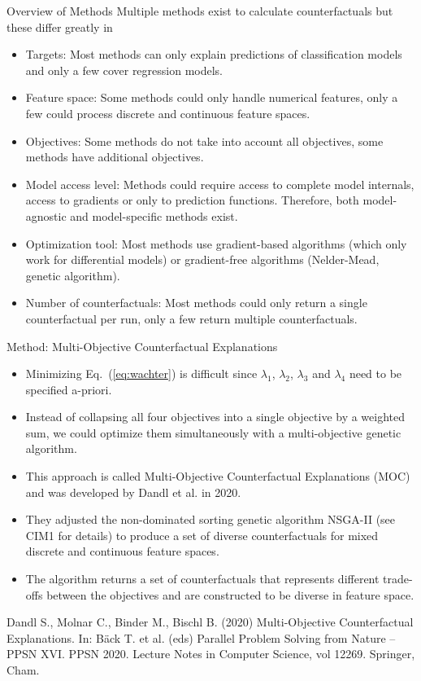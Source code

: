 \documentclass[11pt,compress,t,notes=noshow, xcolor=table]{beamer}
\begin{document}
\begin{vbframe}{Overview of Methods}
	Multiple methods exist to calculate counterfactuals but these differ greatly in 
	\begin{itemize}
		\item Targets: Most methods can only explain predictions of classification models and only a few cover regression models. 
		\item Feature space: Some methods could only handle numerical features, only a few could process discrete and continuous feature spaces. 
		\item Objectives: Some methods do not take into account all objectives, some methods have additional objectives. 
		\item Model access level: Methods could require access to complete model internals, access to gradients or only to prediction functions. Therefore, both model-agnostic and model-specific methods exist. 
		\item Optimization tool: Most methods use gradient-based algorithms (which only work for differential models) or gradient-free algorithms (Nelder-Mead, genetic algorithm). 
		\item Number of counterfactuals: Most methods could only return a single counterfactual per run, only a few return multiple counterfactuals.
	\end{itemize}
\end{vbframe}

\begin{vbframe}{Method: Multi-Objective Counterfactual Explanations}
	\begin{itemize}
		\item Minimizing Eq.~(\ref{eq:wachter}) is difficult since $\lambda_1$, $\lambda_2$, $\lambda_3$ and $\lambda_4$ need to be specified a-priori. 
		\item Instead of collapsing all four objectives into a single objective by a weighted sum, we could optimize them simultaneously with a multi-objective genetic algorithm. 
		\item This approach is called Multi-Objective Counterfactual Explanations (MOC) and was developed by Dandl et al. in 2020. 
		\item They adjusted the non-dominated sorting genetic algorithm NSGA-II (see CIM1 for details) to produce a set of diverse counterfactuals for mixed discrete and continuous feature spaces.
		\item The algorithm returns a set of counterfactuals that represents different trade-offs between the objectives and are constructed to be diverse in feature space.
	\end{itemize}

	\tiny{Dandl S., Molnar C., Binder M., Bischl B. (2020) Multi-Objective Counterfactual Explanations. In: Bäck T. et al. (eds) Parallel Problem Solving from Nature – PPSN XVI. PPSN 2020. Lecture Notes in Computer Science, vol 12269. Springer, Cham.}
	 
\end{vbframe}
\end{document}
